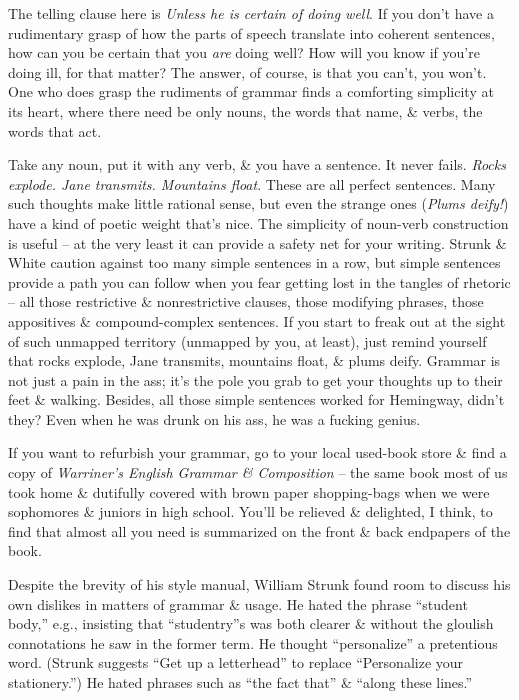 \documentclass{article}
\numberwithin{equation}{section}
\begin{document}
The telling clause here is \textit{Unless he is certain of doing well}. If you don't have a rudimentary grasp of how the parts of speech translate into coherent sentences, how can you be certain that you \textit{are} doing well? How will you know if you're doing ill, for that matter? The answer, of course, is that you can't, you won't. One who does grasp the rudiments of grammar finds a comforting simplicity at its heart, where there need be only nouns, the words that name, \& verbs, the words that act.

Take any noun, put it with any verb, \& you have a sentence. It never fails. \textit{Rocks explode. Jane transmits. Mountains float}. These are all perfect sentences. Many such thoughts make little rational sense, but even the strange ones (\textit{Plums deify!}) have a kind of poetic weight that's nice. The simplicity of noun-verb construction is useful -- at the very least it can provide a safety net for your writing. Strunk \& White caution against too many simple sentences in a row, but simple sentences provide a path you can follow when you fear getting lost in the tangles of rhetoric -- all those restrictive \& nonrestrictive clauses, those modifying phrases, those appositives \& compound-complex sentences. If you start to freak out at the sight of such unmapped territory (unmapped by you, at least), just remind yourself that rocks explode, Jane transmits, mountains float, \& plums deify. Grammar is not just a pain in the ass; it's the pole you grab to get your thoughts up to their feet \& walking. Besides, all those simple sentences worked for Hemingway, didn't they? Even when he was drunk on his ass, he was a fucking genius.

If you want to refurbish your grammar, go to your local used-book store \& find a copy of \textit{Warriner's English Grammar \& Composition} -- the same book most of us took home \& dutifully covered with brown paper shopping-bags when we were sophomores \& juniors in high school. You'll be relieved \& delighted, I think, to find that almost all you need is summarized on the front \& back endpapers of the book.

 Despite the brevity of his style manual, William Strunk found room to discuss his own dislikes in matters of grammar \& usage. He hated the phrase ``student body,'' e.g., insisting that ``studentry''s was both clearer \& without the gloulish connotations he saw in the former term. He thought ``personalize'' a pretentious word. (Strunk suggests ``Get up a letterhead'' to replace ``Personalize your stationery.'') He hated phrases such as ``the fact that'' \& ``along these lines.''
\end{document}
